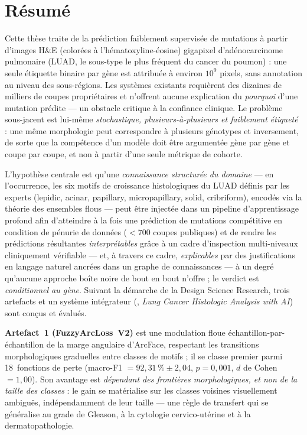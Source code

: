 \chapter*{Résumé}

Cette thèse traite de la prédiction faiblement supervisée de
mutations à partir d'images H\&E (colorées à
l'hématoxyline-éosine) gigapixel d'adénocarcinome pulmonaire
(LUAD, le sous-type le plus fréquent du cancer du poumon) :
une seule étiquette binaire par gène est attribuée à environ
$10^9$ pixels, sans annotation au niveau des sous-régions.
Les systèmes existants requièrent des dizaines de milliers de
coupes propriétaires et n'offrent aucune explication du
\emph{pourquoi} d'une mutation prédite --- un obstacle critique à
la confiance clinique. Le problème sous-jacent est lui-même
\emph{stochastique, plusieurs-à-plusieurs et faiblement étiqueté} :
une même morphologie peut correspondre à plusieurs génotypes et
inversement, de sorte que la compétence d'un modèle doit être
argumentée gène par gène et coupe par coupe, et non à partir
d'une seule métrique de cohorte.

L'hypothèse centrale est qu'une \emph{connaissance structurée du
domaine} --- en l'occurrence, les six motifs de croissance
histologiques du LUAD définis par les experts
(lepidic, acinar, papillary, micropapillary, solid, cribriform),
encodés via la théorie des ensembles flous --- peut être injectée
dans un pipeline d'apprentissage profond afin d'atteindre à la
fois une prédiction de mutations compétitive en condition de
pénurie de données ($<\!700$ coupes publiques) et de rendre les
prédictions résultantes \emph{interprétables} grâce à un cadre
d'inspection multi-niveaux cliniquement vérifiable --- et, à
travers ce cadre, \emph{explicables} par des justifications en
langage naturel ancrées dans un graphe de connaissances --- à un
degré qu'aucune approche boîte noire de bout en bout n'offre ;
le verdict est \emph{conditionnel au gène}.
Suivant la démarche de la Design Science Research, trois
artefacts et un système intégrateur (\lchai{},
\emph{Lung Cancer Histologic Analysis with AI}) sont conçus et
évalués.

\textbf{Artefact~1 (FuzzyArcLoss~V2)} est une modulation floue
échantillon-par-échantillon de la marge angulaire d'ArcFace,
respectant les transitions morphologiques graduelles entre
classes de motifs ; il se classe premier parmi 18~fonctions de
perte (macro-F1 $= 92{,}31\,\%\!\pm\!2{,}04$, $p\!=\!0{,}001$,
$d$ de Cohen $\!=\!1{,}00$). Son avantage est
\emph{dépendant des frontières morphologiques, et non de la
taille des classes} : le gain se matérialise sur les classes
voisines visuellement ambiguës, indépendamment de leur taille
--- une règle de transfert qui se généralise au grade de
Gleason, à la cytologie cervico-utérine et à la dermatopathologie.

